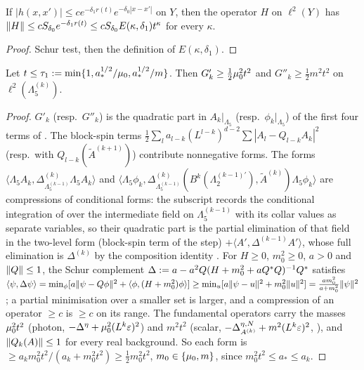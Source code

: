 \begin{lemma}\label{lem:a06d:C23}
If $|h(x,x')|\le ce^{-\delta_1r(t)}e^{-\delta_0|x-x'|}$ on $Y$, then the operator $H$ on $\ell^2(Y)$ has $\lVert H\rVert\le cS_{\delta_0}e^{-\delta_1r(t)}\le cS_{\delta_0}E(\kappa,\delta_1)t^\kappa$ for every $\kappa$.
\end{lemma}

\begin{proof}
Schur test, then the definition of $E(\kappa,\delta_1)$.
\end{proof}

\begin{lemma}[{\cite[(3.11)]{Ba2} with $\gamma_1=\frac12$, without field restriction or regularity of $\tilde A$}]\label{lem:a06d:C24}
Let $t\le\tau_1:=\min\{1,a_*^{1/2}/\mu_0,a_*^{1/2}/m\}$. Then $G'_k\ge\frac12\mu_0^2t^2$ and $G''_k\ge\frac12m^2t^2$ on $\ell^2(\Lambda^{(k)}_5)$.
\end{lemma}

\begin{proof}
$G'_k$ (resp.\ $G''_k$) is the quadratic part in $A_k|_{\Lambda_5}$ (resp.\ $\phi_k|_{\Lambda_5}$) of the first four terms of \cite[(3.9)]{Ba2}. The block-spin terms $\frac12\sum_la_{l-k}(L^{l-k})^{d-2}\sum|A_l-Q_{l-k}A_k|^2$ (resp.\ with $Q_{l-k}(\tilde A^{(k+1)})$) contribute nonnegative forms. The forms $\langle\Lambda_5A_k,\Delta^{(k)}_{\Lambda^{(k-1)}_5}\Lambda_5A_k\rangle$ and $\langle\Lambda_5\phi_k,\Delta^{(k)}_{\Lambda^{(k-1)}_5}(B^k(\Lambda^{(k-1)'}_2),\tilde A^{(k)})\Lambda_5\phi_k\rangle$ are compressions of conditional forms: the subscript records the conditional integration of \cite[(2.46)]{Ba2} over the intermediate field on $\Lambda^{(k-1)}_5$ with its collar values as separate variables, so their quadratic part is the partial elimination of that field in the two-level form (block-spin term of the step) $+\langle A',\Delta^{(k-1)}A'\rangle$, whose full elimination is $\Delta^{(k)}$ by the composition identity \cite[(2.40)--(2.41)]{Ba1}. For $H\ge0$, $m_0^2\ge0$, $a>0$ and $\lVert Q\rVert\le1$, the Schur complement $\Delta:= a-a^2Q(H+m_0^2+aQ^*Q)^{-1}Q^*$ satisfies $\langle\psi,\Delta\psi\rangle=\min_\phi[a\lVert \psi-Q\phi\rVert^2+\langle\phi,(H+m_0^2)\phi\rangle]\ge\min_u[a\lVert \psi-u\rVert^2+m_0^2\lVert u\rVert^2]=\frac{am_0^2}{a+m_0^2}\lVert \psi\rVert^2$; a partial minimisation over a smaller set is larger, and a compression of an operator $\ge c$ is $\ge c$ on its range. The fundamental operators carry the masses $\mu_0^2t^2$ (photon, $-\Delta^\eta+\mu_0^2(L^k\varepsilon)^2$) and $m^2t^2$ (scalar, $-\Delta^{\eta,N}_{A^{(k)}}+m^2(L^k\varepsilon)^2$, \cite[p.~585]{Ba2}), and $\lVert Q_k(A)\rVert\le1$ for every real background. So each form is $\ge a_km_0^2t^2/(a_k+m_0^2t^2)\ge\frac12m_0^2t^2$, $m_0\in\{\mu_0,m\}$, since $m_0^2t^2\le a_*\le a_k$.
\end{proof}

